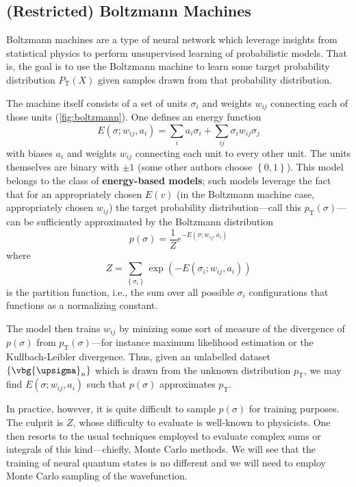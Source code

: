 \documentclass{report}
\begin{document}
\subsection{(Restricted) Boltzmann Machines}
Boltzmann machines are a type of neural network which leverage insights from 
statistical physics to perform unsupervised learning of probabilistic models. 
That is, the goal is to use the Boltzmann machine to learn some target 
probability distribution $ P_{\text{T}}(X) $ given samples drawn from that 
probability distribution. 

The machine itself consists of a set of units $ \sigma_i $ and weights $ w_{ij} $
connecting each of those units (\cref{fig:boltzmann}). One defines an energy 
function 
\begin{equation}
	E(\sigma; w_{ij}, a_i) = \sum_i a_i \sigma_i + \sum_{ij} \sigma_i w_{ij} \sigma_j
\end{equation}
with biases $ a_i $ and weights $ w_{ij} $ connecting each unit to every other 
unit. The units themselves are binary with $ \pm 1 $ (some other authors choose $ 
\left\{0,1\right\} $). This model belongs to the class of \textbf{energy-based 
models}; such models leverage the fact that for an appropriately chosen 
$ E(v) $ (in the Boltzmann machine case, appropriately chosen $ w_{ij} $)
the target probability distribution---call this $ p_{\text{T}}(\sigma) $---can be
sufficiently approximated by the Boltzmann distribution
\begin{equation*}\label{eq:boltzmann-machine-distribution}
	p(\sigma) = \frac{1}{Z} e^{-E(\sigma; w_{ij}, a_i)}
\end{equation*}
where 
\begin{equation*}
	Z = \sum_{\left\{\sigma_i\right\}} \exp(-E (\sigma_i; w_{ij}, a_i))
\end{equation*}
is the partition function, i.e., the sum over all possible $ \sigma_i $ 
configurations that functions as a normalizing constant.

The model then trains $ w_{ij} $ by minizing some sort of measure of the 
divergence of $ p(\sigma) $ from $ p_{\text{T}}(\sigma) $---for instance 
maximum likelihood estimation or the Kullbach-Leibler divergence. Thus, given 
an unlabelled dataset $ \left\{\vbg{\upsigma}_n\right\} $ which is drawn 
from the unknown distribution $ p_{\text{T}} $, we may find $ E(\sigma; w_{ij},
a_i) $ such that $ p(\sigma) $ approximates $ p_{\text{T}} $. 

In practice, however, it is quite difficult to sample $ p(\sigma) $ for 
training purposes. The culprit is $ Z $, whose difficulty to evaluate is
well-known to physicists. One then resorts to the usual techniques employed 
to evaluate complex sums or integrals of this kind---chiefly, Monte Carlo
methods. We will see that the training of neural quantum states is no
different and we will need to employ Monte Carlo sampling of the wavefunction.
\end{document}

